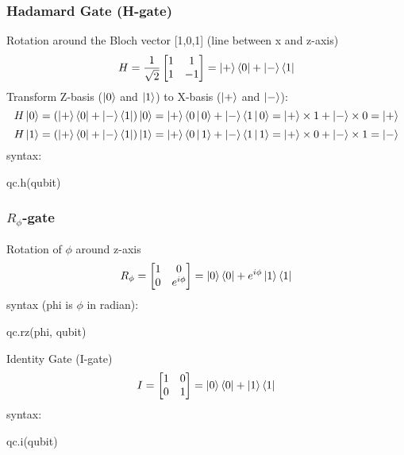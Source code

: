 \documentclass{article}
\begin{document}
\subsubsection*{Hadamard Gate (H-gate)}
Rotation around the Bloch vector [1,0,1] (line between x and z-axis)
$$H=\frac{1}{\sqrt{2}}
\begin{bmatrix}
    1 & 1\\
    1 & -1
\end{bmatrix}=\Ket{+}\Bra{0}+\Ket{-}\Bra{1}$$
Transform Z-basis ($\Ket{0}$ and $\Ket{1}$) to X-basis ($\Ket{+}$ and $\Ket{-}$):
$$H\Ket{0}=\left(\Ket{+}\Bra{0}+\Ket{-}\Bra{1}\right)\Ket{0}=\Ket{+}\Braket{0|0}+\Ket{-}\Braket{1|0}=\Ket{+}\times1+\Ket{-}\times0=\Ket{+}$$
$$H\Ket{1}=\left(\Ket{+}\Bra{0}+\Ket{-}\Bra{1}\right)\Ket{1}=\Ket{+}\Braket{0|1}+\Ket{-}\Braket{1|1}=\Ket{+}\times0+\Ket{-}\times1=\Ket{-}$$
syntax: 
\begin{verbatim*}
qc.h(qubit)    
\end{verbatim*}
\subsubsection*{$R_\phi$-gate}
Rotation of $\phi$ around z-axis
$$R_\phi=
\begin{bmatrix}
    1 & 0\\
    0 & e^{i\phi}
\end{bmatrix}=\Ket{0}\Bra{0}+e^{i\phi}\Ket{1}\Bra{1}
$$
syntax (phi is $\phi$ in radian): 
\begin{verbatim*}
qc.rz(phi, qubit)    
\end{verbatim*}
Identity Gate (I-gate)
$$I=
\begin{bmatrix}
    1 & 0\\
    0 & 1
\end{bmatrix}=\Ket{0}\Bra{0}+\Ket{1}\Bra{1}$$
syntax: 
\begin{verbatim*}
qc.i(qubit)    
\end{verbatim*}
\end{document}
